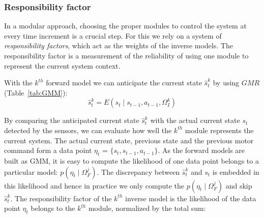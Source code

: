 %

\subsubsection{Responsibility factor}
\label{sec:rf}

In a modular approach, choosing the proper modules to control the
system at every time increment is a crucial step. For this we rely on
a system of {\em responsibility factors}, which act as the weights of
the inverse models. The responsibility factor is a measurement of the
reliability of using one module to represent the current system
context.

%
%

With the $k^{th}$ forward model we can anticipate the current state ${\hat{s}} ^k_t$ by using $GMR$ (Table~\ref{tab:GMM}):
\begin{equation}
\label{e3}
{\hat{s}} ^k_{t} = E\left({s_t {\mid} s_{t-1}, a_{t-1}, \Omega^k_I}\right)
\end{equation}

By comparing the anticipated current state ${\hat{s}} ^k_t$ with the
actual current state $s_t$ detected by the sensors, we can evaluate
how well the $k^{th}$ module represents the current system. The actual
current state, previous state and the previous motor command form a
data point $\eta_t$ = $\{s_t,s_{t-1},a_{t-1}\}$. As the forward models
are built as GMM, it is easy to compute the likelihood of one data
point belongs to a particular model: $p(\eta_t {\mid}
\Omega_F^j)$. The discrepancy between $\hat{s}^k_t$ and $s_t$ is
embedded in this likelihood and hence in practice we only compute the
$p(\eta_t {\mid} \Omega_F^j)$ and skip ${\hat{s}} ^k_t$.  The
responsibility factor of the $k^{th}$ inverse model is the likelihood of
the data point $\eta_t$ belongs to the $k^{th}$ module, normalized by
the total sum:

